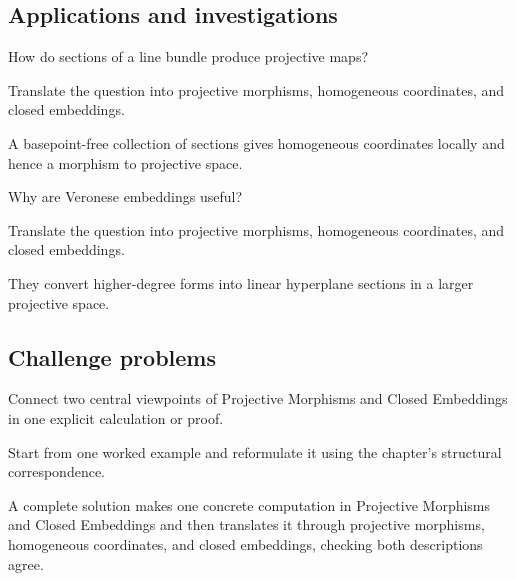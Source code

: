 \subsection*{Applications and investigations}

\begin{exercise}\label{exr:vi38-expand-13}
How do sections of a line bundle produce projective maps?
\end{exercise}
\begin{hint}
Translate the question into projective morphisms, homogeneous coordinates, and closed embeddings.
\end{hint}
\begin{solution}
A basepoint-free collection of sections gives homogeneous coordinates locally and hence a morphism to projective space.
\end{solution}

\begin{exercise}\label{exr:vi38-expand-14}
Why are Veronese embeddings useful?
\end{exercise}
\begin{hint}
Translate the question into projective morphisms, homogeneous coordinates, and closed embeddings.
\end{hint}
\begin{solution}
They convert higher-degree forms into linear hyperplane sections in a larger projective space.
\end{solution}

\subsection*{Challenge problems}

\begin{exercise}\label{exr:vi38-expand-15}
Connect two central viewpoints of Projective Morphisms and Closed Embeddings in one explicit calculation or proof.
\end{exercise}
\begin{hint}
Start from one worked example and reformulate it using the chapter's structural correspondence.
\end{hint}
\begin{solution}
A complete solution makes one concrete computation in Projective Morphisms and Closed Embeddings and then translates it through projective morphisms, homogeneous coordinates, and closed embeddings, checking both descriptions agree.
\end{solution}

